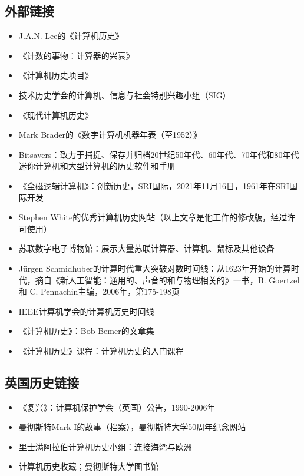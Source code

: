 \subsection{外部链接}
\begin{itemize}
\item  J.A.N. Lee的《计算机历史》
\item 《计数的事物：计算器的兴衰》
\item 《计算机历史项目》
\item  技术历史学会的计算机、信息与社会特别兴趣小组（SIG）
\item 《现代计算机历史》
\item  Mark Brader的《数字计算机机器年表（至1952）》
\item  Bitsavers：致力于捕捉、保存并归档20世纪50年代、60年代、70年代和80年代迷你计算机和大型计算机的历史软件和手册
\item 《全磁逻辑计算机》：创新历史，SRI国际，2021年11月16日，1961年在SRI国际开发
\item  Stephen White的优秀计算机历史网站（以上文章是他工作的修改版，经过许可使用）
\item  苏联数字电子博物馆：展示大量苏联计算器、计算机、鼠标及其他设备
\item  Jürgen Schmidhuber的计算时代重大突破对数时间线：从1623年开始的计算时代，摘自《新人工智能：通用的、声音的和与物理相关的》一书，B. Goertzel 和 C. Pennachin主编，2006年，第175-198页
\item  IEEE计算机学会的计算机历史时间线
\item 《计算机历史》：Bob Bemer的文章集
\item 《计算机历史》课程：计算机历史的入门课程
\end{itemize}
\subsection{英国历史链接}
\begin{itemize}
\item 《复兴》：计算机保护学会（英国）公告，1990-2006年
\item  曼彻斯特Mark I的故事（档案），曼彻斯特大学50周年纪念网站
\item  里士满阿拉伯计算机历史小组：连接海湾与欧洲
\item  计算机历史收藏；曼彻斯特大学图书馆
\end{itemize}